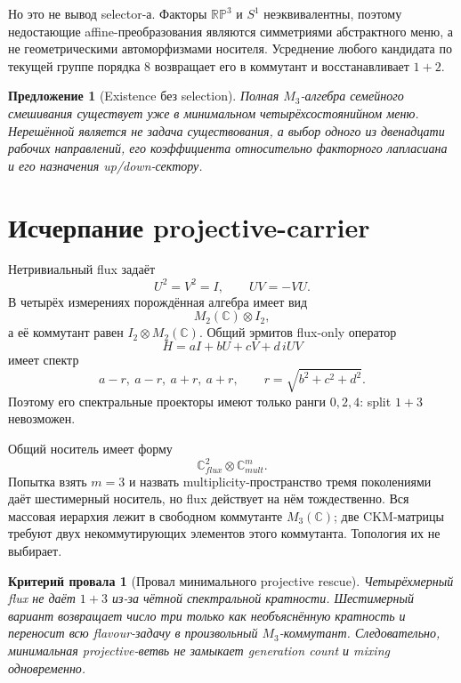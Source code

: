 \documentclass[12pt,a4paper]{article}
\newtheorem{proposition}{Предложение}
\newtheorem{nogocriterion}{Критерий провала}
\begin{document}
Но это не вывод selector-а. Факторы $\mathbb{RP}^3$ и $S^1$ неэквивалентны,
поэтому недостающие affine-преобразования являются симметриями абстрактного
меню, а не геометрическими автоморфизмами носителя. Усреднение любого кандидата
по текущей группе порядка $8$ возвращает его в коммутант и восстанавливает
$1+2$.

\begin{proposition}[Existence без selection]
Полная $M_3$-алгебра семейного смешивания существует уже в минимальном
четырёхсостоянийном меню. Нерешённой является не задача существования, а выбор
одного из двенадцати рабочих направлений, его коэффициента относительно
факторного лапласиана и его назначения up/down-сектору.
\end{proposition}

\section{Исчерпание projective-carrier}

Нетривиальный flux задаёт
\begin{equation}
 U^2=V^2=I,
 \qquad UV=-VU.
\end{equation}
В четырёх измерениях порождённая алгебра имеет вид
\begin{equation}
 M_2(\mathbb C)\otimes I_2,
\end{equation}
а её коммутант равен $I_2\otimes M_2(\mathbb C)$. Общий эрмитов flux-only
оператор
\begin{equation}
 H=aI+bU+cV+d\,iUV
\end{equation}
имеет спектр
\begin{equation}
 a-r,\ a-r,\ a+r,\ a+r,
 \qquad r=\sqrt{b^2+c^2+d^2}.
\end{equation}
Поэтому его спектральные проекторы имеют только ранги $0,2,4$: split $1+3$
невозможен.

Общий носитель имеет форму
\begin{equation}
 \mathbb C^2_{flux}\otimes\mathbb C^m_{mult}.
\end{equation}
Попытка взять $m=3$ и назвать multiplicity-пространство тремя поколениями
даёт шестимерный носитель, но flux действует на нём тождественно. Вся массовая
иерархия лежит в свободном коммутанте $M_3(\mathbb C)$; две CKM-матрицы требуют
двух некоммутирующих элементов этого коммутанта. Топология их не выбирает.

\begin{nogocriterion}[Провал минимального projective rescue]
Четырёхмерный flux не даёт $1+3$ из-за чётной спектральной кратности.
Шестимерный вариант возвращает число три только как необъяснённую кратность и
переносит всю flavour-задачу в произвольный $M_3$-коммутант. Следовательно,
минимальная projective-ветвь не замыкает generation count и mixing одновременно.
\end{nogocriterion}
\end{document}
